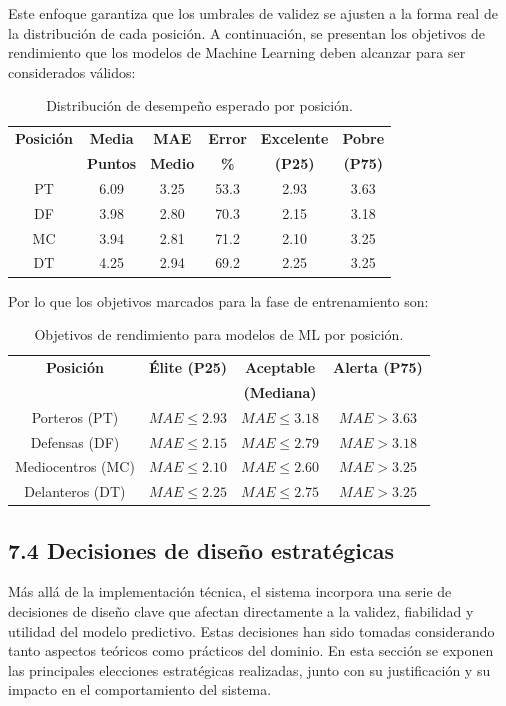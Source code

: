 Este enfoque garantiza que los umbrales de
validez se ajusten a la forma real de la distribución de cada posición.
A continuación, se presentan los objetivos de rendimiento que los modelos de
Machine Learning deben alcanzar para ser considerados válidos:

\begin{table}[H]
\centering
\renewcommand{\arraystretch}{1.3}
\begin{tabular}{|c|c|c|c|c|c|}
\hline
\textbf{Posición} & \textbf{Media} & \textbf{MAE} & \textbf{Error} & 
\textbf{Excelente} & \textbf{Pobre} \\
& \textbf{Puntos} & \textbf{Medio} & \textbf{\%} & \textbf{(P25)} & 
\textbf{(P75)} \\
\hline
PT & 6.09 & 3.25 & 53.3 & 2.93 & 3.63 \\
\hline
DF & 3.98 & 2.80 & 70.3 & 2.15 & 3.18 \\
\hline
MC & 3.94 & 2.81 & 71.2 & 2.10 & 3.25 \\
\hline
DT & 4.25 & 2.94 & 69.2 & 2.25 & 3.25 \\
\hline
\end{tabular}
\caption{Distribución de desempeño esperado por posición.}
\label{tab:benchmarking}
\end{table}
Por lo que los objetivos marcados para la fase de entrenamiento son:

\begin{table}[H]
\centering
\renewcommand{\arraystretch}{1.4}
\begin{tabular}{|c|c|c|c|}
\hline
\textbf{Posición} & \textbf{Élite (P25)} & \textbf{Aceptable} & 
\textbf{Alerta (P75)} \\
& & \textbf{(Mediana)} & \\
\hline
Porteros (PT) & $MAE \le 2.93$ & $MAE \le 3.18$ & $MAE > 3.63$ \\
\hline
Defensas (DF) & $MAE \le 2.15$ & $MAE \le 2.79$ & $MAE > 3.18$ \\
\hline
Mediocentros (MC) & $MAE \le 2.10$ & $MAE \le 2.60$ & $MAE > 3.25$ \\
\hline
Delanteros (DT) & $MAE \le 2.25$ & $MAE \le 2.75$ & $MAE > 3.25$ \\
\hline
\end{tabular}
\caption{Objetivos de rendimiento para modelos de ML por posición.}
\label{tab:objetivos-ml}
\end{table}






\subsection{7.4 Decisiones de diseño estratégicas}
Más allá de la implementación técnica, el sistema incorpora una serie de
decisiones de diseño clave que afectan directamente a la validez, fiabilidad y
utilidad del modelo predictivo. Estas decisiones han sido tomadas considerando
tanto aspectos teóricos como prácticos del dominio.
En esta sección se exponen las principales elecciones estratégicas realizadas,
junto con su justificación y su impacto en el comportamiento del sistema.

